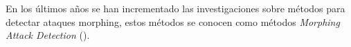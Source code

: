 En los últimos años se han incrementado las investigaciones sobre métodos  para detectar ataques \gls{morphing}, estos métodos 
se conocen como métodos \textit{Morphing Attack Detection} ().





